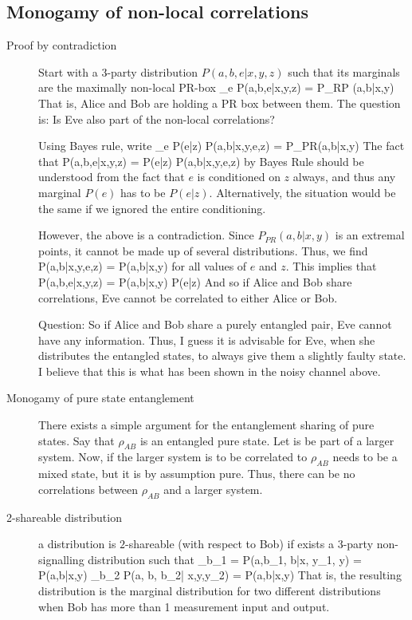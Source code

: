 \subsection{Monogamy of non-local correlations}
\begin{description}

\item[Proof by contradiction] Start with a 3-party distribution $P(a,b,e|x,y,z)$ such that its marginals are the maximally non-local PR-box
\beq
\sum_e P(a,b,e|x,y,z) = P_{RP} (a,b|x,y)
\eeq
That is, Alice and Bob are holding a PR box between them. The question is: Is Eve also part of the non-local correlations? 

Using Bayes rule, write
\beq
\sum_e P(e|z) P(a,b|x,y,e,z) = P_{PR}(a,b|x,y)
\eeq
The fact that 
\beq
P(a,b,e|x,y,z) = P(e|z) P(a,b|x,y,e,z) 
\eeq
by Bayes Rule should be understood from the fact that $e$ is conditioned on $z$ always, and thus any marginal $P(e)$ has to be $P(e|z)$. Alternatively, the situation would be the same if we ignored the entire conditioning. 

However, the above is a contradiction. Since $P_{PR}(a,b|x,y)$ is an extremal points, it cannot be made up of several distributions. Thus, we find
\beq
P(a,b|x,y,e,z) = P(a,b|x,y)
\eeq
for all values of $e$ and $z$. This implies that 
\beq
P(a,b,e|x,y,z) = P(a,b|x,y) P(e|z)
\eeq
And so if Alice and Bob share correlations, Eve cannot be correlated to either Alice or Bob. 

Question: So if Alice and Bob share a purely entangled pair, Eve cannot have any information. Thus, I guess it is advisable for Eve, when she distributes the entangled states, to always give them a slightly faulty state. I believe that this is what has been shown in the noisy channel above. 


\item[Monogamy of pure state entanglement] There exists a simple argument for the entanglement sharing of pure states. Say that $\rho_{AB}$ is an entangled pure state. Let is be part of a larger system. Now, if the larger system is to be correlated to $\rho_{AB}$ needs to be a mixed state, but it is by assumption pure. Thus, there can be no correlations between $\rho_{AB}$ and a larger system. 

\item[2-shareable distribution] a distribution is $2$-shareable (with respect to Bob) if exists a 3-party non-signalling distribution such that 
\beq
\sum_{b_1} = P(a,b_1, b|x, y_1, y) = P(a,b|x,y)
\eeq
\beq
\sum_{b_2} P(a, b, b_2| x,y,y_2) = P(a,b|x,y)
\eeq
That is, the resulting distribution is the marginal distribution for two different distributions when Bob has more than 1 measurement input and output. 


\end{description}

